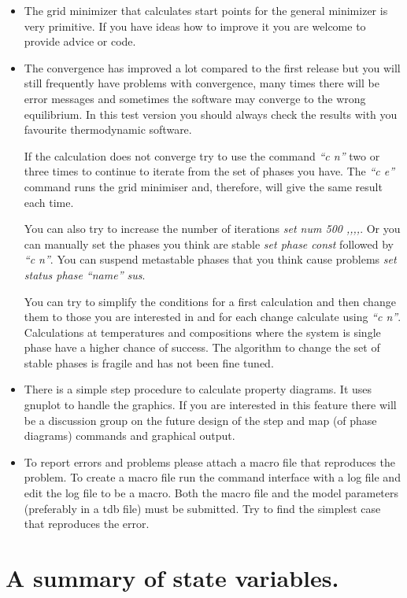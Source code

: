 \documentclass[12pt]{article}
\begin{document}
\begin{itemize}
\item The grid minimizer that calculates start points for the general
minimizer is very primitive.  If you have ideas how to improve it you
are welcome to provide advice or code.

\item The convergence has improved a lot compared to the first release
but you will still frequently have problems with convergence, many
times there will be error messages and sometimes the software may
converge to the wrong equilibrium.  In this test version you should
always check the results with you favourite thermodynamic software.

If the calculation does not converge try to use the command {\em ``c
n''} two or three times to continue to iterate from the set of phases
you have.  The {\em ``c e''} command runs the grid minimiser and,
therefore, will give the same result each time.

You can also try to increase the number of iterations {\em set num 500
,,,,}.  Or you can manually set the phases you think are stable {\em
set phase const} followed by {\em ``c n''}.  You can suspend
metastable phases that you think cause problems {\em set status phase
``name'' sus}.

You can try to simplify the conditions for a first calculation and
then change them to those you are interested in and for each change
calculate using {\em ``c n''}.  Calculations at temperatures and
compositions where the system is single phase have a higher chance of
success.  The algorithm to change the set of stable phases is fragile
and has not been fine tuned.

\item There is a simple step procedure to calculate property diagrams.
It uses gnuplot to handle the graphics.  If you are interested in this
feature there will be a discussion group on the future design of the
step and map (of phase diagrams) commands and graphical output.

\item To report errors and problems please attach a macro file that
reproduces the problem.  To create a macro file run the command
interface with a log file and edit the log file to be a macro.  Both
the macro file and the model parameters (preferably in a tdb file)
must be submitted.  Try to find the simplest case that reproduces the
error.

\end{itemize}

\section{A summary of state variables.}
\end{document}
